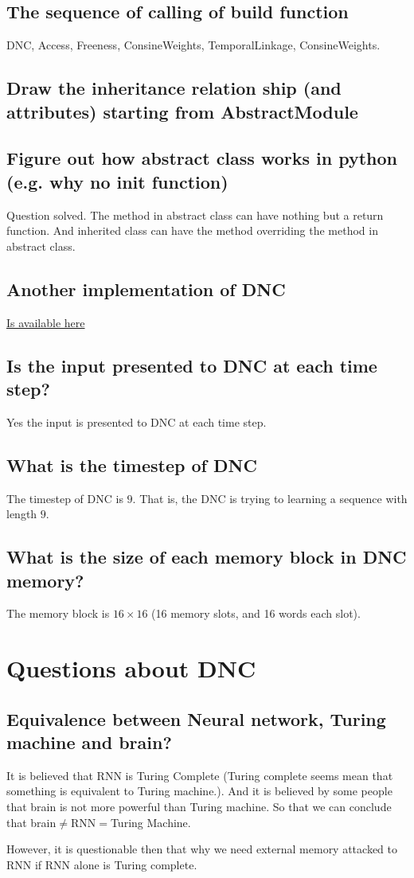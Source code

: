 \documentclass{article}
\begin{document}
\subsection{The sequence of calling of build function}
DNC, Access, Freeness, ConsineWeights, TemporalLinkage, ConsineWeights.
\subsection{Draw the inheritance relation ship (and attributes) starting from AbstractModule}
\subsection{Figure out how abstract class works in python (e.g. why no init function)}
Question solved. The method in abstract class can have nothing but a return function. And inherited class can have the method overriding the method in abstract class.

\subsection{Another implementation of DNC}
\href{https://github.com/Mostafa-Samir/DNC-tensorflow/blob/master/dnc/dnc.py}{Is available here}

\subsection{Is the input presented to DNC at each time step?}
Yes the input is presented to DNC at each time step.
\subsection{What is the timestep of DNC}
The timestep of DNC is $9$. That is, the DNC is trying to learning a sequence with length $9$.

\subsection{What is the size of each memory block in DNC memory?}
The memory block is $16\times16$ (16 memory slots, and 16 words each slot).

\section{Questions about DNC}
\subsection{Equivalence between Neural network, Turing machine and brain?}
It is believed that RNN is Turing Complete (Turing complete seems mean that something is equivalent to Turing machine.). And it is believed by some people that brain is not more powerful than Turing machine. So that we can conclude that brain$\neq$RNN$=$Turing Machine.

However, it is questionable then that why we need external memory attacked to RNN if RNN alone is Turing complete.
\end{document}
